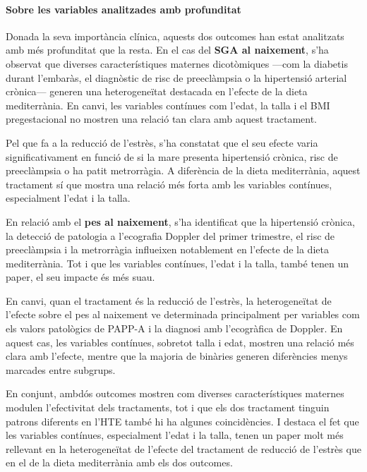 \documentclass[../main.tex]{subfiles}
\begin{document}
   \paragraph{Sobre les variables analitzades amb profunditat} Donada la seva importància clínica, aquests dos outcomes han estat analitzats amb més profunditat que la resta. En el cas del \textbf{SGA al naixement}, s’ha observat que diverses característiques maternes dicotòmiques —com la diabetis durant l’embaràs, el diagnòstic de risc de preeclàmpsia o la hipertensió arterial crònica— generen una heterogeneïtat destacada en l’efecte de la dieta mediterrània. En canvi, les variables contínues com l’edat, la talla i el BMI pregestacional no mostren una relació tan clara amb aquest tractament.\par
    Pel que fa a la reducció de l’estrès, s’ha constatat que el seu efecte varia significativament en funció de si la mare presenta hipertensió crònica, risc de preeclàmpsia o ha patit metrorràgia. A diferència de la dieta mediterrània, aquest tractament sí que mostra una relació més forta amb les variables contínues, especialment l’edat i la talla.\par
    En relació amb el \textbf{pes al naixement}, s’ha identificat que la hipertensió crònica, la detecció de patologia a l’ecografia Doppler del primer trimestre, el risc de preeclàmpsia i la metrorràgia influeixen notablement en l’efecte de la dieta mediterrània. Tot i que les variables contínues, l'edat i la talla, també tenen un paper, el seu impacte és més suau.\par
    En canvi, quan el tractament és la reducció de l’estrès, la heterogeneïtat de l’efecte sobre el pes al naixement ve determinada principalment per variables com els valors patològics de PAPP-A i la diagnosi amb l'ecogràfica de Doppler. En aquest cas, les variables contínues, sobretot talla i edat, mostren una relació més clara amb l'efecte, mentre que la majoria de binàries generen diferències menys marcades entre subgrups.\par
    En conjunt, ambdós outcomes mostren com diverses característiques maternes modulen l’efectivitat dels tractaments, tot i que els dos tractament tinguin patrons diferents en l'HTE també hi ha algunes coincidències. I destaca el fet que les variables contínues, especialment l’edat i la talla, tenen un paper molt més rellevant en la heterogeneïtat de l’efecte del tractament de reducció de l’estrès que en el de la dieta mediterrània amb els dos outcomes.

    
    
\end{document}
